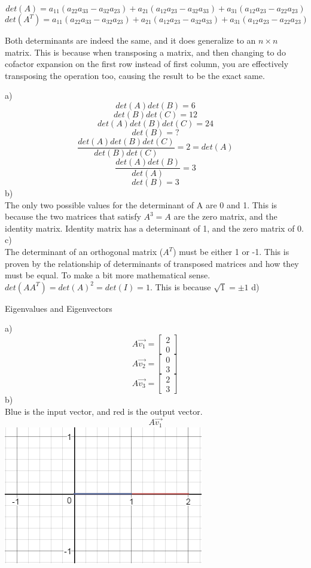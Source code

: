 \documentclass[12pt]{article}
\newcommand{\sqbrl}{\left[}
\newcommand{\sqbrr}{\right]}
\newenvironment{problem}[2][Problem]{\begin{trivlist}
\item[\hskip \labelsep {\bfseries #1}\hskip \labelsep {\bfseries #2.}]}{\end{trivlist}}
\begin{document}
\[det(A) = a_{11}(a_{22}a_{33} - a_{32}a_{23}) + a_{21}(a_{12}a_{23} - a_{32}a_{33}) + a_{31}(a_{12}a_{23} - a_{22}a_{23})\]
\[det(A^T) = a_{11}(a_{22}a_{33} - a_{32}a_{23}) + a_{21}(a_{12}a_{23} - a_{32}a_{33}) + a_{31}(a_{12}a_{23} - a_{22}a_{23})\]

Both determinants are indeed the same, and it does generalize to an $n\times n$ matrix. This is because when transposing a matrix, and then changing to do cofactor expansion on the first row instead of first column, you are effectively transposing the operation too, causing the result to be the exact same.

\begin{problem}{10}
a)\\
\[det(A)det(B) = 6\]
\[det(B)det(C) = 12\]
\[det(A)det(B)det(C) = 24\]
\[det(B) = ?\]
\[\frac{det(A)det(B)det(C)}{det(B)det(C)} = 2 = det(A)\]
\[\frac{det(A)det(B)}{det(A)} = 3\]
\[det(B) = 3\]
b)\\
The only two possible values for the determinant of A are 0 and 1. This is because the two matrices that satisfy $A^3 = A$ are the zero matrix, and the identity matrix. Identity matrix has a determinant of 1, and the zero matrix of 0.\\
c)\\
The determinant of an orthogonal matrix ($A^T$) must be either 1 or -1. This is proven by the relationship of determinants of transposed matrices and how they must be equal. To make a bit more mathematical sense. $det(AA^T) = det(A)^2 = det(I) = 1$. This is because $\sqrt{1} = \pm 1$
d)\\


\begin{problem}{11}
	Eigenvalues and Eigenvectors
\end{problem}
a)\\
\[A\vec{v_1} = \sqbrl\begin{matrix}2\\0\end{matrix}\sqbrr\] %
\[A\vec{v_2} = \sqbrl\begin{matrix}0\\3\end{matrix}\sqbrr\] %
\[A\vec{v_3} = \sqbrl\begin{matrix}2\\3\end{matrix}\sqbrr\]
b)\\
Blue is the input vector, and red is the output vector.\\
\[A\vec{v_1} \]
\includegraphics{Av1}


\end{problem}
\end{document}
